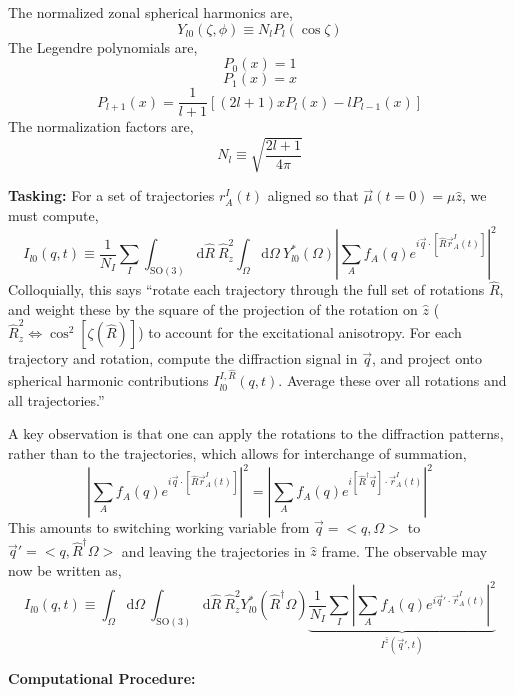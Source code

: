 \documentclass[fleqn,oneside,12pt]{article}
\begin{document}
The normalized zonal spherical harmonics are,
\[
Y_{l0} (\zeta, \phi)
\equiv
N_{l} 
P_{l} (\cos \zeta)
\]
The Legendre polynomials are,
\[
P_{0} (x) = 1
\]
\[
P_{1} (x) = x
\]
\[
P_{l+1} (x)
=
\frac{1}{l+1}
\left [
(2l + 1) x P_{l} (x)
-
l P_{l-1} (x)
\right ]
\]
The normalization factors are,
\[
N_{l}
\equiv
\sqrt{\frac{2l + 1}{4 \pi}}
\]

\textbf{Tasking:} For a set of trajectories $r_{A}^{I} (t)$ aligned so that
$\vec \mu (t = 0) = \mu \hat z$, we must compute,
\[
I_{l0} (q, t)
\equiv
\frac{1}{N_{I}}
\sum_{I}
\int_{\mathrm{SO}(3)}
\mathrm{d} \hat R \
\hat R_{z}^{2}
\int_{\Omega}
\mathrm{d} \Omega \
Y_{l0}^{*} (\Omega)
\left |
\sum_{A}
f_{A} (q)
e^{i \vec q \cdot [\hat R \vec r_A^I (t)]}
\right |^2
\]
Colloquially, this says ``rotate each trajectory through the full set of
rotations $\hat R$, and weight these by the square of the projection of the
rotation on $\hat z$ ($\hat R_z^2 \Leftrightarrow \cos^2 [\zeta (\hat R)]$) to
account for the excitational anisotropy. For each trajectory and rotation,
compute the diffraction signal in $\vec q$, and project onto spherical harmonic
contributions $I_{l0}^{I, \hat R} (q, t)$. Average these over all rotations and
all trajectories.''

A key observation is that one can apply the rotations to the diffraction
patterns, rather than to the trajectories, which allows for interchange of
summation,
\[
\left |
\sum_{A}
f_{A} (q)
e^{i \vec q \cdot [\hat R \vec r_A^I (t)]}
\right |^2
=
\left |
\sum_{A}
f_{A} (q)
e^{i [\hat R^\dagger \vec q] \cdot \vec r_A^I (t)}
\right |^2
\]
This amounts to switching working variable from $\vec q = <q, \Omega>$ to $\vec
q' = <q, \hat R^\dagger \Omega>$ and leaving the trajectories in $\hat z$ frame.
The observable may now be written as,
\[
I_{l0} (q, t)
\equiv
\int_{\Omega}
\mathrm{d} \Omega \
\int_{\mathrm{SO}(3)}
\mathrm{d} \hat R \
\hat R_{z}^2
Y_{l0}^{*} (\hat R^\dagger \Omega)
\underbrace{
\frac{1}{N_{I}}
\sum_{I}
\left |
\sum_{A}
f_{A} (q)
e^{i \vec q' \cdot \vec r_A^I (t)}
\right |^2
}_{
I^{\hat z} (\vec q', t)
}
\]

\textbf{Computational Procedure:} 
\end{document}
